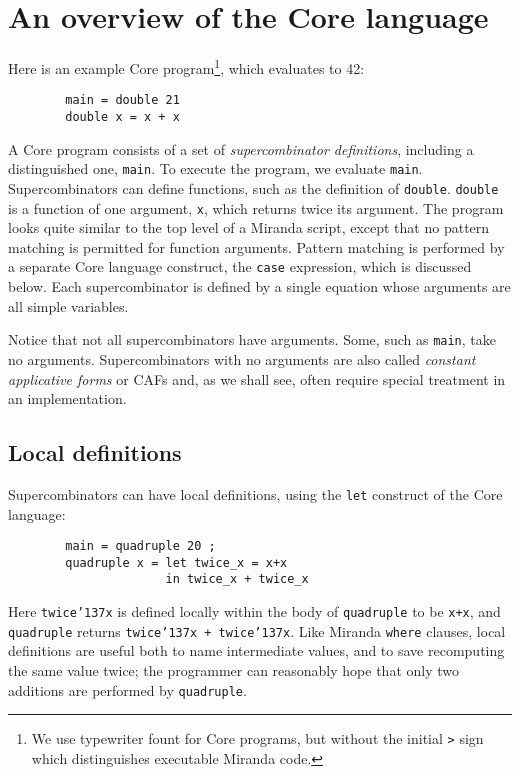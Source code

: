 \section{An overview of the Core language}
\label{sect:core-overview}

Here is an example Core program\footnote{%
We use typewriter fount for Core programs, but without the initial \mbox{\tt >} sign
which distinguishes executable Miranda code.
}, which evaluates to 42:
\begin{verbatim}
        main = double 21
        double x = x + x
\end{verbatim}
A Core program consists of a set of
{\em supercombinator definitions}, including
a distinguished one, \mbox{\tt main}.  To execute the program, we evaluate \mbox{\tt main}.
Supercombinators can define functions, such as the definition of \mbox{\tt double}.
\mbox{\tt double} is a function of one argument, \mbox{\tt x}, which returns twice its argument.
The program looks
quite similar to the top level of a Miranda script, except that
no pattern matching is permitted for function arguments.  Pattern matching is
performed by a separate Core language construct, the \mbox{\tt case} expression, which
is discussed below.  Each supercombinator is
defined by a single equation whose
arguments are all simple variables.

Notice that not all supercombinators have arguments. Some, such as \mbox{\tt main}, take
no arguments.  Supercombinators with no arguments are also called {\em constant
applicative forms\/} or CAFs
and, as we shall see, often require special
treatment in an implementation.

\subsection{Local definitions}

Supercombinators can have local definitions,
using the \mbox{\tt let} construct of
the Core language:
\begin{verbatim}
        main = quadruple 20 ;
        quadruple x = let twice_x = x+x
                      in twice_x + twice_x
\end{verbatim}
Here \mbox{\tt twice{\char'137}x} is defined locally within the body of \mbox{\tt quadruple} to
be \mbox{\tt x+x}, and
\mbox{\tt quadruple} returns \mbox{\tt twice{\char'137}x\ +\ twice{\char'137}x}.  Like Miranda \mbox{\tt where} clauses,
local definitions are useful both
to name intermediate values, and to save recomputing the same value twice;
the programmer can reasonably hope that only two additions are performed by
\mbox{\tt quadruple}.

